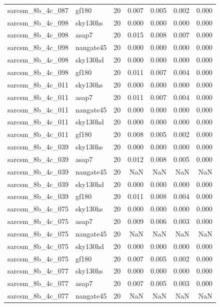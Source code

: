 \begin{tabular}{llrrrrr}
sarcsm\_8b\_4c\_087 & gf180 & 20 & 0.007 & 0.005 & 0.002 & 0.000 \\
sarcsm\_8b\_4c\_098 & sky130hs & 20 & 0.000 & 0.000 & 0.000 & 0.000 \\
sarcsm\_8b\_4c\_098 & asap7 & 20 & 0.015 & 0.008 & 0.007 & 0.000 \\
sarcsm\_8b\_4c\_098 & nangate45 & 20 & 0.000 & 0.000 & 0.000 & 0.000 \\
sarcsm\_8b\_4c\_098 & sky130hd & 20 & 0.000 & 0.000 & 0.000 & 0.000 \\
sarcsm\_8b\_4c\_098 & gf180 & 20 & 0.011 & 0.007 & 0.004 & 0.000 \\
sarcsm\_8b\_4c\_011 & sky130hs & 20 & 0.000 & 0.000 & 0.000 & 0.000 \\
sarcsm\_8b\_4c\_011 & asap7 & 20 & 0.011 & 0.007 & 0.004 & 0.000 \\
sarcsm\_8b\_4c\_011 & nangate45 & 20 & 0.000 & 0.000 & 0.000 & 0.000 \\
sarcsm\_8b\_4c\_011 & sky130hd & 20 & 0.000 & 0.000 & 0.000 & 0.000 \\
sarcsm\_8b\_4c\_011 & gf180 & 20 & 0.008 & 0.005 & 0.002 & 0.000 \\
sarcsm\_8b\_4c\_039 & sky130hs & 20 & 0.000 & 0.000 & 0.000 & 0.000 \\
sarcsm\_8b\_4c\_039 & asap7 & 20 & 0.012 & 0.008 & 0.005 & 0.000 \\
sarcsm\_8b\_4c\_039 & nangate45 & 20 & NaN & NaN & NaN & NaN \\
sarcsm\_8b\_4c\_039 & sky130hd & 20 & 0.000 & 0.000 & 0.000 & 0.000 \\
sarcsm\_8b\_4c\_039 & gf180 & 20 & 0.011 & 0.008 & 0.004 & 0.000 \\
sarcsm\_8b\_4c\_075 & sky130hs & 20 & 0.000 & 0.000 & 0.000 & 0.000 \\
sarcsm\_8b\_4c\_075 & asap7 & 20 & 0.009 & 0.006 & 0.003 & 0.000 \\
sarcsm\_8b\_4c\_075 & nangate45 & 20 & NaN & NaN & NaN & NaN \\
sarcsm\_8b\_4c\_075 & sky130hd & 20 & 0.000 & 0.000 & 0.000 & 0.000 \\
sarcsm\_8b\_4c\_075 & gf180 & 20 & 0.007 & 0.005 & 0.002 & 0.000 \\
sarcsm\_8b\_4c\_077 & sky130hs & 20 & 0.000 & 0.000 & 0.000 & 0.000 \\
sarcsm\_8b\_4c\_077 & asap7 & 20 & 0.007 & 0.005 & 0.003 & 0.000 \\
sarcsm\_8b\_4c\_077 & nangate45 & 20 & NaN & NaN & NaN & NaN \\

\end{tabular}
